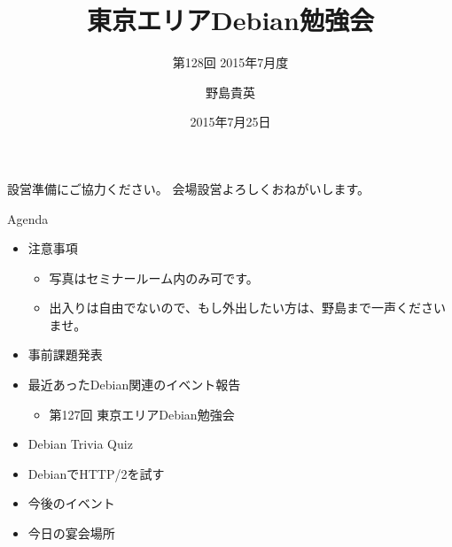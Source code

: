 \title{東京エリアDebian勉強会}
\subtitle{第128回 2015年7月度}
\author{野島貴英}
\date{2015年7月25日}



\begin{frame}
\titlepage{}
\end{frame}

\begin{frame}{設営準備にご協力ください。}
会場設営よろしくおねがいします。
\end{frame}

\begin{frame}{Agenda}
 \begin{minipage}[t]{0.45\hsize}
  \begin{itemize}
   \item 注意事項
	 \begin{itemize}
	  \item 写真はセミナールーム内のみ可です。
          \item 出入りは自由でないので、もし外出したい方は、野島まで一声くださいませ。
	 \end{itemize}
   \item 事前課題発表
  \end{itemize}
 \end{minipage} 
 \begin{minipage}[t]{0.45\hsize}
  \begin{itemize}
   \item 最近あったDebian関連のイベント報告
	 \begin{itemize}
	 \item 第127回 東京エリアDebian勉強会
	 \end{itemize}
   \item Debian Trivia Quiz
   \item DebianでHTTP/2を試す
   \item 今後のイベント
   \item 今日の宴会場所
  \end{itemize}
 \end{minipage}
\end{frame}

